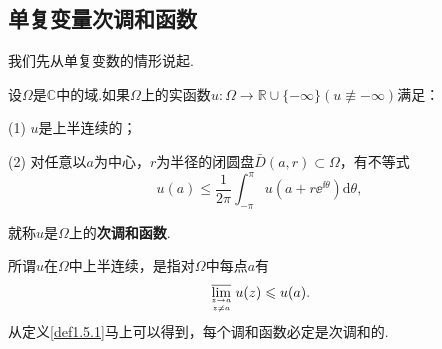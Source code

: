 \subsection{单复变量次调和函数}
我们先从单复变数的情形说起.
\begin{definition}\label{def1.5.1}
	设$\Omega$是$\mathbb{C}$中的域.如果$\Omega$上的实函数$u\colon\Omega\to\mathbb{R}\cup\{-\infty\}(u\not\equiv-\infty)$满足：
	
	(1)\hypertarget{1.5.1}{}
	$u$是上半连续的；
	
	(2)\hypertarget{1.5.1}{}
	对任意以$a$为中心，$r$为半径的闭圆盘$\bar{D}(a,r)\subset\Omega$，有不等式
	\[u(a)\le\frac1{2\pi} \int_{-\pi}^{\pi} u(a+r\ee^{\ii\theta})\mathrm{d}\theta,\]
	
	就称$u$是$\Omega$上的\textbf{次调和函数}.
\end{definition}
所谓$u$在$\Omega$中上半连续，是指对$\Omega$中每点$a$有
\[\varlimsup\limits_{z\to a\atop z\neq a}u(z)\le u(a).\]
从定义\ref{def1.5.1}马上可以得到，每个调和函数必定是次调和的.

